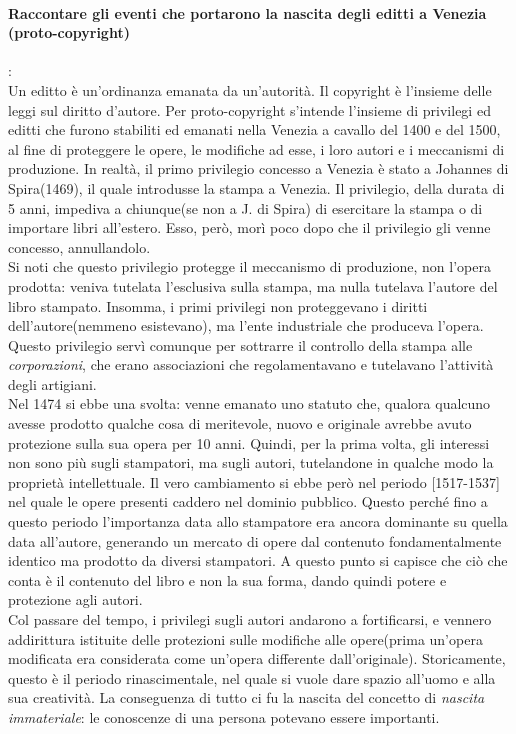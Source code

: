 \documentclass[a4paper]{article}
\begin{document}
		\paragraph{Raccontare gli eventi che portarono la nascita degli editti a Venezia (proto-copyright)}: \\
		Un editto è un'ordinanza emanata da un'autorità.
		Il copyright è l'insieme delle leggi sul diritto d'autore.
		Per proto-copyright s'intende l'insieme di privilegi ed editti che furono stabiliti ed emanati nella Venezia a cavallo del 1400 e del 1500, al fine di proteggere le opere, le modifiche ad esse, i loro autori e i meccanismi di produzione.
		In realtà, il primo privilegio concesso a Venezia è stato a Johannes di Spira(1469), il quale introdusse la stampa a Venezia. Il privilegio, della durata di 5 anni, impediva a chiunque(se non a J. di Spira) di esercitare la stampa o di importare libri all'estero. Esso, però, morì poco dopo che il privilegio gli venne concesso, annullandolo. \\
		Si noti che questo privilegio protegge il meccanismo di produzione, non l'opera prodotta: veniva tutelata l'esclusiva sulla stampa, ma nulla tutelava l'autore del libro stampato.
		Insomma, i primi privilegi non proteggevano i diritti dell'autore(nemmeno esistevano), ma l'ente industriale che produceva l'opera.
		Questo privilegio servì comunque per sottrarre il controllo della stampa alle \textit{corporazioni}, che erano associazioni che regolamentavano e tutelavano l'attività degli artigiani.\\
		Nel 1474 si ebbe una svolta: venne emanato uno statuto che, qualora qualcuno avesse prodotto qualche cosa di meritevole, nuovo e originale avrebbe avuto protezione sulla sua opera per 10 anni. Quindi, per la prima volta, gli interessi non sono più sugli stampatori, ma sugli autori, tutelandone in qualche modo la proprietà intellettuale.
		Il vero cambiamento si ebbe però nel periodo [1517-1537] nel quale le opere presenti caddero nel dominio pubblico. Questo perché fino a questo periodo l'importanza data allo stampatore era ancora dominante su quella data all'autore, generando un mercato di opere dal contenuto fondamentalmente identico ma prodotto da diversi stampatori. A questo punto si capisce che ciò che conta è il contenuto del libro e non la sua forma, dando quindi potere e protezione agli autori.\\
		Col passare del tempo, i privilegi sugli autori andarono a fortificarsi, e vennero addirittura istituite delle protezioni sulle modifiche alle opere(prima un'opera modificata era considerata come un'opera differente dall'originale).
		Storicamente, questo è il periodo rinascimentale, nel quale si vuole dare spazio all'uomo e alla sua creatività.
		La conseguenza di tutto ci fu la nascita del concetto di \textit{nascita immateriale}: le conoscenze di una persona potevano essere importanti.
		
\end{document}
